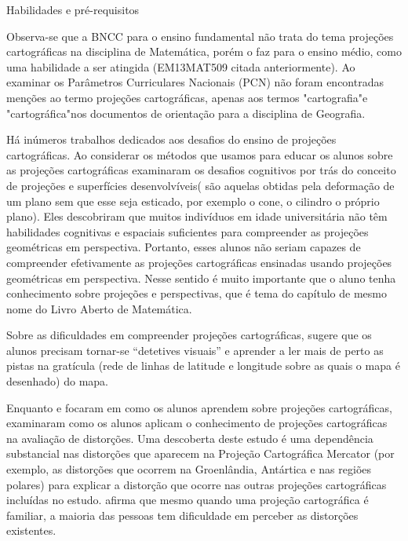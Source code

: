 \begin{apresentacao}{Habilidades e pré-requisitos}
{Observa-se que a BNCC para o ensino fundamental não trata do tema projeções cartográficas na disciplina de Matemática, porém o faz para o ensino médio, como uma habilidade a ser atingida (EM13MAT509 citada anteriormente).  Ao examinar os Parâmetros Curriculares Nacionais (PCN) \citep{PCN} não foram encontradas menções ao termo projeções cartográficas, apenas aos termos "cartografia"{}e "cartográfica"{}nos documentos de orientação para a disciplina de Geografia. 

Há inúmeros trabalhos dedicados aos desafios do ensino de projeções cartográficas. Ao considerar os métodos que usamos para educar os alunos sobre as projeções cartográficas \cite{Downs}  examinaram os desafios cognitivos por trás do conceito de projeções e superfícies desenvolvíveis( são aquelas obtidas pela deformação de um plano sem que esse seja esticado, por exemplo o cone, o cilindro o próprio plano). Eles descobriram que muitos indivíduos em idade universitária não têm habilidades cognitivas e espaciais suficientes para compreender as projeções geométricas em perspectiva. Portanto, esses alunos não seriam capazes de compreender efetivamente as projeções cartográficas ensinadas usando projeções geométricas em perspectiva. Nesse sentido é muito importante que o aluno tenha conhecimento sobre projeções e perspectivas, que é tema do capítulo de mesmo nome do Livro Aberto de Matemática.

 Sobre as dificuldades em compreender projeções cartográficas, \cite{Olson} sugere que os alunos  precisam  tornar-se “detetives visuais” e aprender a ler mais de perto as pistas na gratícula (rede de linhas de latitude e longitude sobre as quais o mapa é desenhado) do mapa.

Enquanto \cite{Downs} e \cite{Olson} focaram em como os alunos aprendem sobre projeções cartográficas, \cite{Battersby} examinaram como os alunos aplicam o conhecimento de projeções cartográficas na avaliação de distorções. Uma descoberta deste estudo é uma dependência substancial nas distorções que aparecem na Projeção Cartográfica Mercator (por exemplo, as distorções que ocorrem na Groenlândia, Antártica e nas regiões polares) para explicar a distorção que ocorre nas outras projeções cartográficas incluídas no estudo. \cite{Battersby} afirma que mesmo quando uma projeção cartográfica é familiar, a maioria das pessoas tem dificuldade em perceber as distorções existentes.

}
\end{apresentacao}
